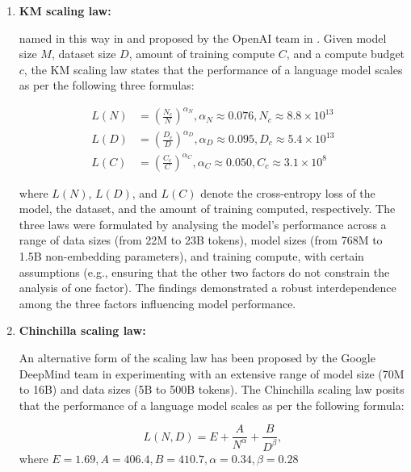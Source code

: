 \begin{enumerate}
	\item \textbf{KM scaling law:} {named in this way in \textcite{survey} and proposed by the OpenAI team in \textcite{kaplan2020scaling}. Given model size $M$, dataset size $D$, amount of training compute $C$, and a compute budget $c$, the KM scaling law states that the performance of a language model scales as per the following three formulas:

		      \begin{equation}
			      \begin{aligned}
				      L(N) & =(\frac{N_c}{N})^{\alpha_N}, \alpha_N \approx 0.076, N_c \approx 8.8 \times 10^{13} \\
				      L(D) & =(\frac{D_c}{D})^{\alpha_D}, \alpha_D \approx 0.095, D_c \approx 5.4 \times 10^{13} \\
				      L(C) & =(\frac{C_c}{C})^{\alpha_C}, \alpha_C \approx 0.050, C_c \approx 3.1 \times 10^8
			      \end{aligned}
			      \label{eq:km-scaling-law}
		      \end{equation}

		      \noindent where $L(N)$, $L(D)$, and $L(C)$ denote the cross-entropy loss of the model, the dataset, and the amount of training computed, respectively.
		      The three laws were formulated by analysing the model's performance across a range of data sizes (from 22M to 23B tokens), model sizes (from 768M to 1.5B non-embedding parameters), and training compute, with certain assumptions (e.g., ensuring that the other two factors do not constrain the analysis of one factor).
		      The findings demonstrated a robust interdependence among the three factors influencing model performance.
	      }
	\item \textbf{Chinchilla scaling law:} {An alternative form of the scaling law has been proposed by the Google DeepMind team in \textcite{hoffmann2022training} experimenting with an extensive range of model size (70M to 16B) and data sizes (5B to 500B tokens).
		      The Chinchilla scaling law posits that the performance of a language model scales as per the following formula:

		      \begin{equation}
			      L(N,D) = E + \frac{A}{N^\alpha} + \frac{B}{D^\beta},
			      \label{eq:chinchilla-scaling-law}
		      \end{equation}
		      \noindent where $E=1.69, A=406.4,B = 410.7, \alpha = 0.34, \beta = 0.28$

}
\end{enumerate}
